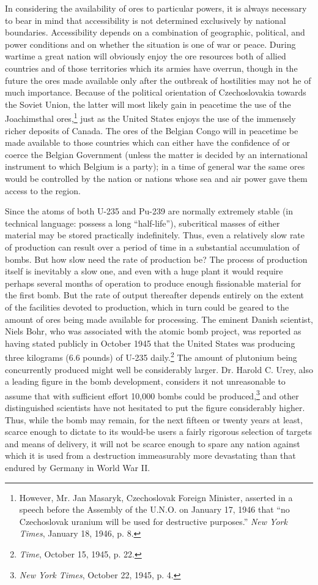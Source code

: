 In considering the availability of ores to particular powers, it is always necessary to bear in mind that accessibility is not determined exclusively by national boundaries. Accessibility depends on a combination of geographic, political, and power conditions and on whether the situation is one of war or peace. During wartime a great nation will obviously enjoy the ore resources both of allied countries and of those territories which its armies have overrun, though in the future the ores made available only after the outbreak of hostilities may not he of much importance. Because of the political orientation of Czechoslovakia towards the Soviet Union, the latter will most likely gain in peacetime the use of the Joachimsthal ores,\footnote{However, Mr. Jan Masaryk, Czechoslovak Foreign Minister, asserted in a speech before the Assembly of the U.N.O. on January 17, 1946 that ``no Czechoslovak uranium will be used for destructive purposes.'' \textit{New York Times}, January 18, 1946, p. 8.} just as the United States enjoys the use of the immensely richer deposits of Canada. The ores of the Belgian Congo will in peacetime be made available to those countries which can either have the confidence of or coerce the Belgian Government (unless the matter is decided by an international instrument to which Belgium is a party); in a time of general war the same ores would be controlled by the nation or nations whose sea and air power gave them access to the region.

Since the atoms of both U-235 and Pu-239 are normally extremely stable (in technical language: possess a long ``half-life''), subcritical masses of either material may be stored practically indefinitely. Thus, even a relatively slow rate of production can result over a period of time in a substantial accumulation of bombs. But how slow need the rate of production be? The process of production itself is inevitably a slow one, and even with a huge plant it would require perhaps several months of operation to produce enough fissionable material for the first bomb. But the rate of output thereafter depends entirely on the extent of the facilities devoted to production, which in turn could be geared to the amount of ores being made available for processing. The eminent Danish scientist, Niels Bohr, who was associated with the atomic bomb project, was reported as having stated publicly in October 1945 that the United States was producing three kilograms (6.6 pounds) of U-235 daily.\footnote{\emph{Time}, October 15, 1945, p. 22.} The amount of plutonium being concurrently produced might well be considerably larger. Dr. Harold C. Urey, also a leading figure in the bomb development, considers it not unreasonable to assume that with sufficient effort 10,000 bombs could be produced,\footnote{\textit{New York Times}, October 22, 1945, p. 4.} and other distinguished scientists have not hesitated to put the figure considerably higher. Thus, while the bomb may remain, for the next fifteen or twenty years at least, scarce enough to dictate to its would-be users a fairly rigorous selection of targets and means of delivery, it will not be scarce enough to spare any nation against which it is used from a destruction immeasurably more devastating than that endured by Germany in World War II.

